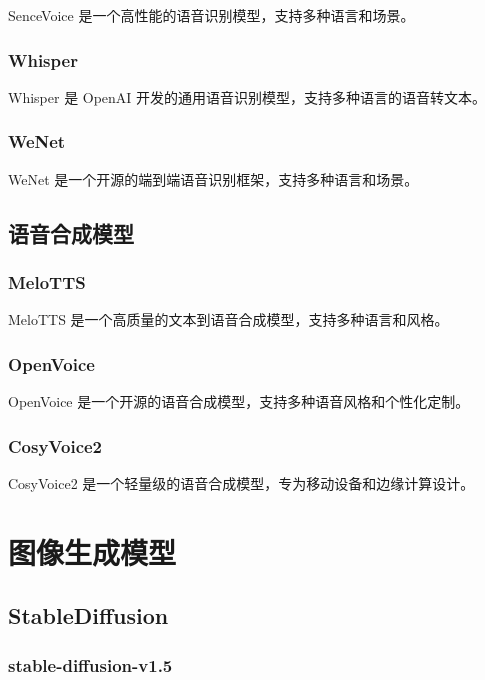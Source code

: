 \documentclass[12pt,UTF8]{ctexbook}
\begin{document}
SenceVoice 是一个高性能的语音识别模型，支持多种语言和场景。

\subsection{Whisper}

Whisper 是 OpenAI 开发的通用语音识别模型，支持多种语言的语音转文本。

\subsection{WeNet}

WeNet 是一个开源的端到端语音识别框架，支持多种语言和场景。

\section{语音合成模型}

\subsection{MeloTTS}

MeloTTS 是一个高质量的文本到语音合成模型，支持多种语言和风格。

\subsection{OpenVoice}

OpenVoice 是一个开源的语音合成模型，支持多种语音风格和个性化定制。

\subsection{CosyVoice2}

CosyVoice2 是一个轻量级的语音合成模型，专为移动设备和边缘计算设计。

\chapter{图像生成模型}

\section{StableDiffusion}

\subsection{stable-diffusion-v1.5}
\end{document}
